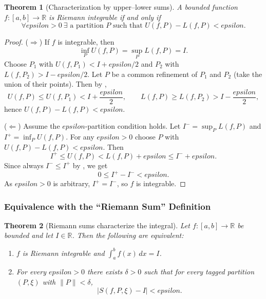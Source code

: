 \documentclass[12pt]{article}
\numberwithin{equation}{section}
\def\abs#1{|#1|}
\def\eps{epsilon}
\def\diff{d}
\newcommand{\RR}{\mathbb{R}}
\DeclarePairedDelimiter{\abs}{\lvert}{\rvert}
\newcommand{\eps}{\varepsilon}               %
\newcommand{\diff}{\mathop{}\!\mathrm{d}}    %
\theoremstyle{plain}
\newtheorem{theorem}{Theorem}[section]
\theoremstyle{definition}
\theoremstyle{remark}
\begin{document}
\begin{theorem}[Characterization by upper--lower sums]\label{thm:UL-char}
A bounded function $f:[a,b]\to\RR$ is Riemann integrable if and only if
\[
\forall \eps>0\ \exists \text{ a partition }P \text{ such that } U(f,P)-L(f,P)<\eps.
\]
\end{theorem}

\begin{proof}
($\Rightarrow$) If $f$ is integrable, then
\[
\inf_P U(f,P)=\sup_P L(f,P)=I.
\]
Choose $P_1$ with $U(f,P_1)<I+\eps/2$ and $P_2$ with $L(f,P_2)>I-\eps/2$.
Let $P$ be a common refinement of $P_1$ and $P_2$ (take the union of their points).
Then by ,
\[
U(f,P)\le U(f,P_1)<I+\frac{\eps}{2},
\qquad
L(f,P)\ge L(f,P_2)>I-\frac{\eps}{2},
\]
hence $U(f,P)-L(f,P)<\eps$.

($\Leftarrow$) Assume the $\eps$-partition condition holds.
Let $I^-=\sup_P L(f,P)$ and $I^+=\inf_P U(f,P)$.
For any $\eps>0$ choose $P$ with $U(f,P)-L(f,P)<\eps$.
Then
\[
I^+ \le U(f,P) < L(f,P)+\eps \le I^-+\eps.
\]
Since always $I^-\le I^+$ by , we get
\[
0\le I^+-I^-<\eps.
\]
As $\eps>0$ is arbitrary, $I^+=I^-$, so $f$ is integrable.
\end{proof}

\subsubsection{Equivalence with the ``Riemann Sum'' Definition}

\begin{theorem}[Riemann sums characterize the integral]\label{thm:riemann-sums}
Let $f:[a,b]\to\RR$ be bounded and let $I\in\RR$.
Then the following are equivalent:
\begin{enumerate}[label=(\alph*)]
\item $f$ is Riemann integrable and $\displaystyle \int_a^b f(x)\,\diff x = I$.
\item For every $\eps>0$ there exists $\delta>0$ such that for every tagged partition $(P,\xi)$ with $\|P\|<\delta$,
\[
\abs{S(f,P,\xi)-I}<\eps.
\]
\end{enumerate}
\end{theorem}
\end{document}

